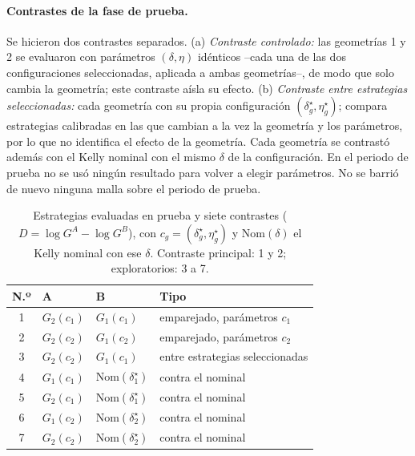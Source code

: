 \paragraph{Contrastes de la fase de prueba.}\label{sec:contrastes} Se hicieron dos contrastes separados. (a) \emph{Contraste controlado:} las geometrías 1 y 2 se evaluaron con parámetros $(\delta,\eta)$ idénticos --cada una de las dos configuraciones seleccionadas, aplicada a ambas geometrías--, de modo que solo cambia la geometría; este contraste aísla su efecto. (b) \emph{Contraste entre estrategias seleccionadas:} cada geometría con su propia configuración $(\delta_g^\star,\eta_g^\star)$; compara estrategias calibradas en las que cambian a la vez la geometría y los parámetros, por lo que no identifica el efecto de la geometría. Cada geometría se contrastó además con el Kelly nominal con el mismo $\delta$ de la configuración. En el periodo de prueba no se usó ningún resultado para volver a elegir parámetros.
 No se barrió de nuevo ninguna malla sobre el periodo de prueba.

\begin{table}[h]
\centering
\caption{Estrategias evaluadas en prueba y siete contrastes ($D=\log G^{A}-\log G^{B}$), con $c_g=(\delta_g^\star,\eta_g^\star)$ y $\mathrm{Nom}(\delta)$ el Kelly nominal con ese $\delta$. Contraste principal: 1 y 2; exploratorios: 3 a 7.}\label{tab:contrastes}
\begin{tabular}{|c|p{3.4cm}|p{3.4cm}|p{4.6cm}|}
\hline
\textbf{N.º} & \textbf{A} & \textbf{B} & \textbf{Tipo} \\ \hline
1 & $G_2(c_1)$ & $G_1(c_1)$ & emparejado, parámetros $c_1$ \\ \hline
2 & $G_2(c_2)$ & $G_1(c_2)$ & emparejado, parámetros $c_2$ \\ \hline
3 & $G_2(c_2)$ & $G_1(c_1)$ & entre estrategias seleccionadas \\ \hline
4 & $G_1(c_1)$ & $\mathrm{Nom}(\delta_1^\star)$ & contra el nominal \\ \hline
5 & $G_2(c_1)$ & $\mathrm{Nom}(\delta_1^\star)$ & contra el nominal \\ \hline
6 & $G_1(c_2)$ & $\mathrm{Nom}(\delta_2^\star)$ & contra el nominal \\ \hline
7 & $G_2(c_2)$ & $\mathrm{Nom}(\delta_2^\star)$ & contra el nominal \\ \hline
\end{tabular}
\end{table}

